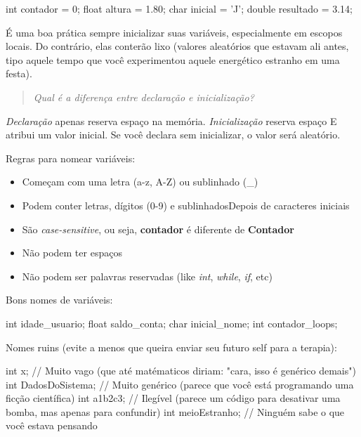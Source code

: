\begin{ccode}
  int contador = 0;
  float altura = 1.80;
  char inicial = 'J';
  double resultado = 3.14;
\end{ccode}

É uma boa prática sempre inicializar suas variáveis, especialmente em escopos locais. Do contrário, elas conterão lixo (valores aleatórios que estavam ali antes, tipo aquele tempo que você experimentou aquele energético estranho em uma festa).

\begin{quote}
\textit{Qual é a diferença entre declaração e inicialização?}
\end{quote}

\textit{Declaração} apenas reserva espaço na memória. \textit{Inicialização} reserva espaço E atribui um valor inicial. Se você declara sem inicializar, o valor será aleatório.

Regras para nomear variáveis:

\begin{itemize}
  \item Começam com uma letra (a-z, A-Z) ou sublinhado (\_)
  \item Podem conter letras, dígitos (0-9) e sublinhadosDepois de caracteres iniciais
  \item São \textit{case-sensitive}, ou seja, \textbf{contador} é diferente de \textbf{Contador}
  \item Não podem ter espaços
  \item Não podem ser palavras reservadas (like \textit{int}, \textit{while}, \textit{if}, etc)
\end{itemize}

Bons nomes de variáveis:

\begin{ccode}
  int idade_usuario;
  float saldo_conta;
  char inicial_nome;
  int contador_loops;
\end{ccode}

Nomes ruins (evite a menos que queira enviar seu futuro self para a terapia):

\begin{ccode}
  int x;           // Muito vago (que até matématicos diriam: "cara, isso é genérico demais")
  int DadosDoSistema;  // Muito genérico (parece que você está programando uma ficção científica)
  int a1b2c3;      // Ilegível (parece um código para desativar uma bomba, mas apenas para confundir)
  int meioEstranho;  // Ninguém sabe o que você estava pensando
\end{ccode}

